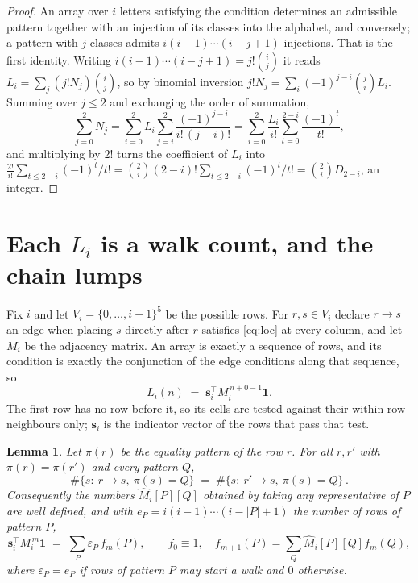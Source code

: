 \documentclass[11pt,a4paper]{article}
\theoremstyle{plain}
\newtheorem{lemma}[theorem]{Lemma}
\theoremstyle{definition}
\begin{document}
\begin{proof}
An array over $i$ letters satisfying the condition determines an admissible pattern together
with an injection of its classes into the alphabet, and conversely; a pattern with $j$
classes admits $i(i-1)\cdots(i-j+1)$ injections. That is the first identity. Writing
$i(i-1)\cdots(i-j+1)=j!\binom{i}{j}$ it reads $L_i=\sum_j (j!N_j)\binom{i}{j}$, so by
binomial inversion $j!N_j=\sum_{i}(-1)^{j-i}\binom{j}{i}L_i$. Summing over
$j\le 2$ and exchanging the order of summation,
\[
\sum_{j=0}^{2}N_j=\sum_{i=0}^{2}L_i\sum_{j=i}^{2}\frac{(-1)^{j-i}}{i!\,(j-i)!}
=\sum_{i=0}^{2}\frac{L_i}{i!}\sum_{t=0}^{2-i}\frac{(-1)^t}{t!} ,
\]
and multiplying by $2!$ turns the coefficient of $L_i$ into
$\frac{2!}{i!}\sum_{t\le 2-i}(-1)^t/t!=\binom{2}{i}(2-i)!\sum_{t\le 2-i}(-1)^t/t!
=\binom{2}{i}D_{2-i}$, an integer.
\end{proof}

\section{Each $L_i$ is a walk count, and the chain lumps}

Fix $i$ and let $V_i=\{0,\dots,i-1\}^{5}$ be the possible rows. For $r,s\in V_i$
declare $r\to s$ an edge when placing $s$ directly after $r$ satisfies \eqref{eq:loc} at
every column, and let $M_i$ be the adjacency matrix. An array is exactly a sequence of
rows, and its condition is exactly the conjunction of the edge conditions along that
sequence, so
\[
L_i(n)\;=\;\mathbf{s}_i^{\!\top}M_i^{\,n+0-1}\mathbf{1} .
\]
The first row has no row before it, so its cells are tested
against their within-row neighbours only; $\mathbf{s}_i$ is the indicator vector of the
rows that pass that test.

\begin{lemma}\label{lem:lump}
Let $\pi(r)$ be the equality pattern of the row $r$. For all $r,r'$ with
$\pi(r)=\pi(r')$ and every pattern $Q$,
\[
\#\{s:\ r\to s,\ \pi(s)=Q\}\;=\;\#\{s:\ r'\to s,\ \pi(s)=Q\}\, .
\]
Consequently the numbers $\widehat M_i[P][Q]$ obtained by taking any representative of $P$
are well defined, and with $e_P=i(i-1)\cdots(i-|P|+1)$ the number of rows of pattern $P$,
\[
\mathbf{s}_i^{\!\top}M_i^{\,m}\mathbf{1}\;=\;\sum_P \varepsilon_P\,f_m(P),
\qquad f_0\equiv1,\quad f_{m+1}(P)=\sum_Q\widehat M_i[P][Q]f_m(Q),
\]
where $\varepsilon_P=e_P$ if rows of pattern $P$ may start a walk and $0$ otherwise.
\end{lemma}
\end{document}
